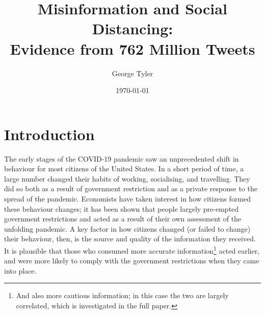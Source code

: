 \documentclass{article}
\author{George Tyler}
\date{\today}
\begin{document}
\title{Misinformation and Social Distancing: \\ Evidence from 762 Million Tweets}

\maketitle

\section{Introduction}
The early stages of the COVID-19 pandemic saw an unprecedented shift in behaviour for most citizens of the United States. In a short period of time, a large number changed their habits of working, socialising, and travelling. They did so both as a result of government restriction and as a private response to the spread of the pandemic. Economists have taken interest in how citizens formed these behaviour changes; it has been shown that people largely pre-empted government restrictions and acted as a result of their own assessment of the unfolding pandemic. A key factor in how citizens changed (or failed to change) their behaviour, then, is the source and quality of the information they received. It is plausible that those who consumed more accurate information\footnote{And also more cautious information; in this case the two are largely correlated, which is investigated in the full paper.} acted earlier, and were more likely to comply with the government restrictions when they came into place. 




\end{document}
